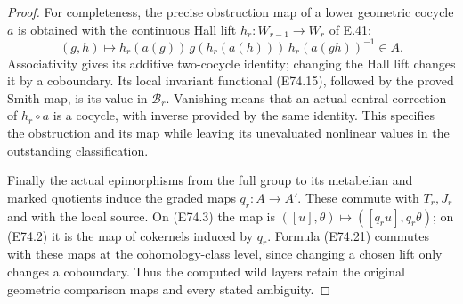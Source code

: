 \begin{proof}
For completeness, the precise obstruction map of a
lower geometric cocycle $a$ is obtained with the
continuous Hall lift $h_r:W_{r-1}\to W_r$ of E.41:
\[
 (g,h)\longmapsto
 h_r(a(g))\,g(h_r(a(h)))\,h_r(a(gh))^{-1}\in A.
 \tag{E74.21}
\]
Associativity gives its additive two-cocycle identity;
changing the Hall lift changes it by a coboundary.
Its local invariant functional (E74.15), followed
by the proved Smith map, is its value in $\mathcal B_r$.
Vanishing means that an actual central correction
of $h_r\circ a$ is a cocycle, with inverse provided
by the same identity. This specifies the obstruction
and its map while leaving its unevaluated nonlinear
values in the outstanding classification.

Finally the actual epimorphisms from the full group
to its metabelian and marked quotients induce the
graded maps $q_r:A\to A'$. These commute with
$T_r,J_r$ and with the local source. On (E74.3) the
map is $([u],\theta)\mapsto([q_ru],q_r\theta)$;
on (E74.2) it is the map of cokernels induced by
$q_r$. Formula (E74.21) commutes with these maps
at the cohomology-class level, since changing a
chosen lift only changes a coboundary. Thus the
computed wild layers retain the original geometric
comparison maps and every stated ambiguity.
\end{proof}
